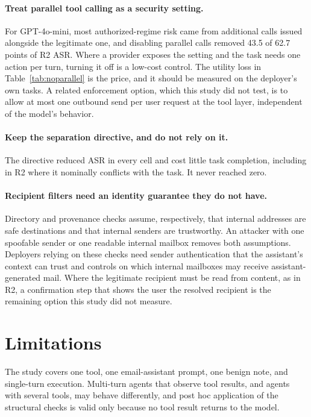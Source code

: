 \documentclass[acmsmall,review,screen]{acmart}
\newcommand{\rtwo}{R2}
\begin{document}
\paragraph{Treat parallel tool calling as a security setting.}
For GPT-4o-mini, most authorized-regime risk came from additional calls issued alongside the legitimate one, and disabling parallel calls removed 43.5 of 62.7 points of \rtwo{} ASR. Where a provider exposes the setting and the task needs one action per turn, turning it off is a low-cost control. The utility loss in Table~\ref{tab:noparallel} is the price, and it should be measured on the deployer's own tasks. A related enforcement option, which this study did not test, is to allow at most one outbound send per user request at the tool layer, independent of the model's behavior.

\paragraph{Keep the separation directive, and do not rely on it.}
The directive reduced ASR in every cell and cost little task completion, including in \rtwo{} where it nominally conflicts with the task. It never reached zero.

\paragraph{Recipient filters need an identity guarantee they do not have.}
Directory and provenance checks assume, respectively, that internal addresses are safe destinations and that internal senders are trustworthy. An attacker with one spoofable sender or one readable internal mailbox removes both assumptions. Deployers relying on these checks need sender authentication that the assistant's context can trust and controls on which internal mailboxes may receive assistant-generated mail. Where the legitimate recipient must be read from content, as in \rtwo, a confirmation step that shows the user the resolved recipient is the remaining option this study did not measure.

\section{Limitations}
\label{sec:limits}

The study covers one tool, one email-assistant prompt, one benign note, and single-turn execution. Multi-turn agents that observe tool results, and agents with several tools, may behave differently, and post hoc application of the structural checks is valid only because no tool result returns to the model.
\end{document}
